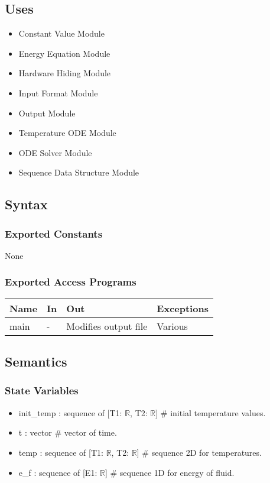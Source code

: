 \documentclass[12pt, titlepage]{article}
\begin{document}
\subsection{Uses}

\begin{itemize}
    \item Constant Value Module
    \item Energy Equation Module
    \item Hardware Hiding Module
    \item Input Format Module 
    \item Output Module 
    \item Temperature ODE Module
    \item ODE Solver Module
    \item Sequence Data Structure Module
\end{itemize}

\subsection{Syntax}

\subsubsection{Exported Constants}
None
\subsubsection{Exported Access Programs}

\begin{center}
\begin{tabular}{p{2cm} p{4cm} p{4cm} p{2cm}}
\hline
\textbf{Name} & \textbf{In} & \textbf{Out} & \textbf{Exceptions} \\
\hline
main & - & Modifies output file & Various \\
\hline
\end{tabular}
\end{center}

\subsection{Semantics}

\subsubsection{State Variables}
\begin{itemize}
    \item init\_temp : sequence of [T1: $\mathbb{R}$, T2: $ \mathbb{R}$]            \# initial temperature values.  
    \item t : vector        \# vector of time. 
    \item temp : sequence of [T1: $\mathbb{R}$, T2: $\mathbb{R}$]   \# sequence 2D for temperatures. 
    \item e\_f : sequence of [E1: $ \mathbb{R}$] \# sequence 1D for energy of fluid. 
\end{itemize}
\end{document}
